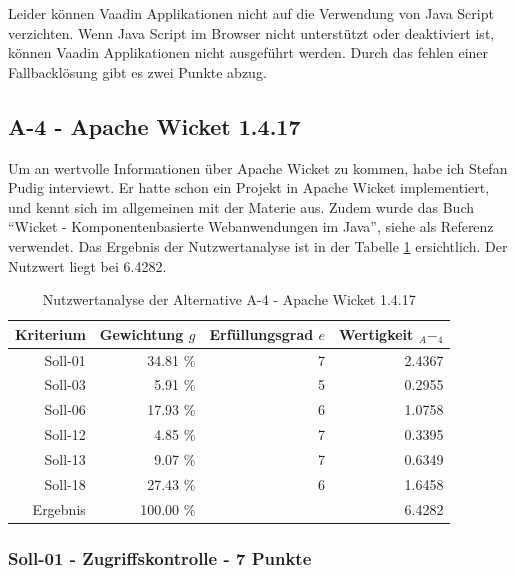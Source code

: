   Leider können Vaadin Applikationen nicht auf die Verwendung von Java
  Script verzichten. Wenn Java Script im Browser nicht unterstützt oder
  deaktiviert ist, können Vaadin Applikationen nicht ausgeführt werden. Durch
  das fehlen einer Fallbacklösung gibt es zwei Punkte abzug.
  
  \subsection{A-4 - Apache Wicket 1.4.17}
  
  Um an wertvolle Informationen über Apache Wicket zu kommen, habe ich Stefan
  Pudig interviewt. Er hatte schon ein Projekt in Apache Wicket implementiert,
  und kennt sich im allgemeinen mit der Materie aus. Zudem wurde das Buch
  ``Wicket - Komponentenbasierte Webanwendungen im Java'', siehe \cite{Wicket} als
  Referenz verwendet. Das Ergebnis der Nutzwertanalyse ist in der Tabelle
  \ref{tab:nwaA4} ersichtlich. Der Nutzwert liegt bei 6.4282.
  
  \begin{table}[ht]
    \sffamily 
    \begin{center}
      \begin{tabular}{r|rrr}
        \toprule
        \textbf{Kriterium} & \textbf{Gewichtung \(g\)} & \textbf{Erfüllungsgrad
        \(e\)} & \textbf{Wertigkeit \(_A-_4\)} \\
        \midrule
        Soll-01   & 34.81 \% & 7 & 2.4367 \\
        Soll-03   &  5.91 \% & 5 & 0.2955 \\
        Soll-06   & 17.93 \% & 6 & 1.0758 \\
        Soll-12   &  4.85 \% & 7 & 0.3395 \\
        Soll-13   &  9.07 \% & 7 & 0.6349 \\
        Soll-18   & 27.43 \% & 6 & 1.6458 \\
        \midrule
        \midrule
        Ergebnis  & 100.00 \% &   & 6.4282 \\
        \bottomrule
      \end{tabular}
      \caption{Nutzwertanalyse der Alternative A-4 - Apache Wicket 1.4.17}
      \label{tab:nwaA4}
    \end{center}
  \end{table}
  
  \subsubsection{Soll-01 - Zugriffskontrolle - 7 Punkte}
  
